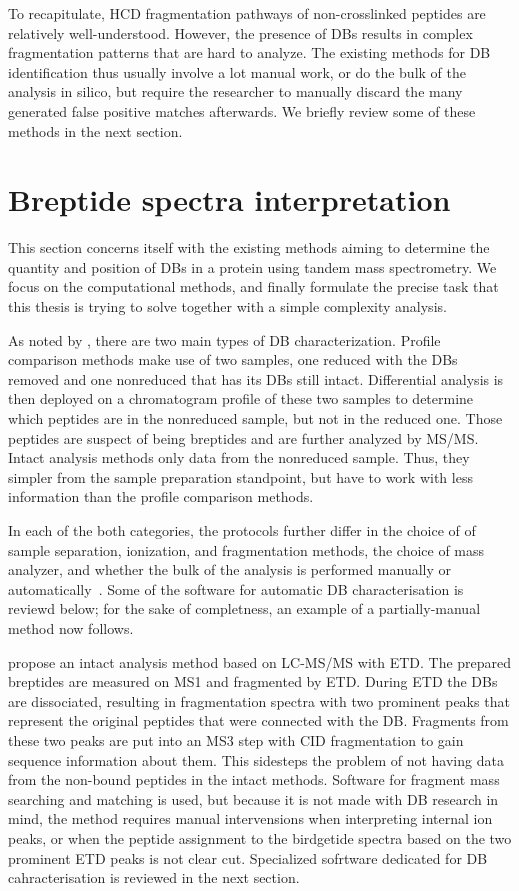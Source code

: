 To recapitulate, HCD fragmentation pathways of non-crosslinked peptides are relatively well-understood. However, the presence of DBs results in complex fragmentation patterns that are hard to analyze. The existing methods for DB identification thus usually involve a lot manual work, or do the bulk of the analysis in silico, but require the researcher to manually discard the many generated false positive matches afterwards. We briefly review some of these methods in the next section.

\section{Breptide spectra interpretation}

This section concerns itself with the existing methods aiming to determine the quantity and position of DBs in a protein using tandem mass spectrometry. We focus on the computational methods, and finally formulate the precise task that this thesis is trying to solve together with a simple complexity analysis.

As noted by \citet{lakbub2018recent}, there are two main types of DB characterization. Profile comparison methods make use of two samples, one reduced with the DBs removed and one nonreduced that has its DBs still intact. Differential analysis is then deployed on a chromatogram profile of these two samples to determine which peptides are in the nonreduced sample, but not in the reduced one. Those peptides are suspect of being breptides and are further analyzed by MS/MS. Intact analysis methods only data from the nonreduced sample. Thus, they simpler from the sample preparation standpoint, but have to work with less information than the profile comparison methods.

In each of the both categories, the protocols further differ in the choice of of sample separation, ionization, and fragmentation methods, the choice of mass analyzer, and whether the bulk of the analysis is performed manually or automatically~\cite{lakbub2018recent}. Some of the software for automatic DB characterisation is reviewd below; for the sake of completness, an example of a partially-manual method now follows.

\citet{wu2009mass} propose an intact analysis method based on LC-MS/MS with ETD\@. The prepared breptides are measured on MS1 and fragmented by ETD\@. During ETD the DBs are dissociated, resulting in fragmentation spectra with two prominent peaks that represent the original peptides that were connected with the DB\@. Fragments from these two peaks are put into an MS3 step with CID fragmentation to gain sequence information about them. This sidesteps the problem of not having data from the non-bound peptides in the intact methods. Software for fragment mass searching and matching is used, but because it is not made with DB research in mind, the method requires manual intervensions when interpreting internal ion peaks, or when the peptide assignment to the birdgetide spectra based on the two prominent ETD peaks is not clear cut. Specialized sofrtware dedicated for DB cahracterisation is reviewed in the next section.

